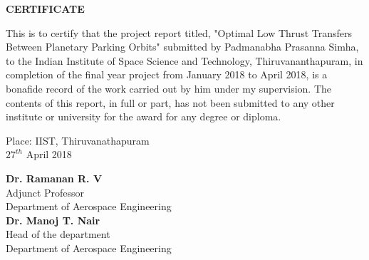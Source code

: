 
\begin{dedication} 
\vspace*{-1.5in}
\begin{center}
\textbf{{\large CERTIFICATE}}
\end{center}
\vspace*{0.5in}
\noindent This is to certify that the project report titled, "Optimal Low Thrust Transfers Between Planetary Parking Orbits" submitted by Padmanabha Prasanna Simha, to the Indian Institute of Space Science and Technology, Thiruvananthapuram, in completion of the final year project from January 2018 to April 2018, is a bonafide record of the work carried out by him under my supervision. The contents of this report, in full or part, has not been submitted to any other institute or university for the award for any degree or diploma.
%

\vspace*{1.25in}
\noindent
\begin{minipage}{\textwidth}
\begin{minipage}{0.49\linewidth}
\begin{flushleft}
	\vspace{1.90in}
Place: IIST, Thiruvanathapuram\\
$27^{th}$ April 2018

 \end{flushleft}
  \end{minipage}
  \begin{minipage}{0.49\linewidth}
 \begin{flushright}

 {\bf Dr. Ramanan R. V} \\
Adjunct Professor \\ 
Department of Aerospace Engineering\\
\vspace{1in}
 {\bf Dr. Manoj T. Nair} \\
  Head of the department \\ 
   Department of Aerospace Engineering\\

 \end{flushright}
  \end{minipage}
 \end{minipage}



%


\end{dedication}